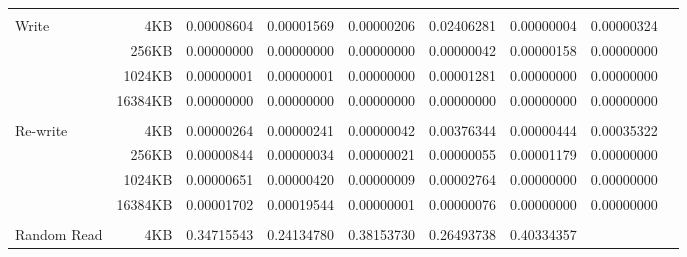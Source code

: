 \begin{table}[!htp]
\begin{tabular}{lrrrrrrrr}
& & & & & & & \\
\multirow{4}{*}{Write} &4KB &\cellcolor[HTML]{f4c7c3}0.00008604 &\cellcolor[HTML]{f4c7c3}0.00001569 &\cellcolor[HTML]{f4c7c3}0.00000206 &\cellcolor[HTML]{f4c7c3}0.02406281 &\cellcolor[HTML]{f4c7c3}0.00000004 &\cellcolor[HTML]{f4c7c3}0.00000324 \\
&256KB &\cellcolor[HTML]{f4c7c3}0.00000000 &\cellcolor[HTML]{f4c7c3}0.00000000 &\cellcolor[HTML]{f4c7c3}0.00000000 &\cellcolor[HTML]{f4c7c3}0.00000042 &\cellcolor[HTML]{f4c7c3}0.00000158 &\cellcolor[HTML]{f4c7c3}0.00000000 \\
&1024KB &\cellcolor[HTML]{f4c7c3}0.00000001 &\cellcolor[HTML]{f4c7c3}0.00000001 &\cellcolor[HTML]{f4c7c3}0.00000000 &\cellcolor[HTML]{f4c7c3}0.00001281 &\cellcolor[HTML]{f4c7c3}0.00000000 &\cellcolor[HTML]{f4c7c3}0.00000000 \\
&16384KB &\cellcolor[HTML]{f4c7c3}0.00000000 &\cellcolor[HTML]{f4c7c3}0.00000000 &\cellcolor[HTML]{f4c7c3}0.00000000 &\cellcolor[HTML]{f4c7c3}0.00000000 &\cellcolor[HTML]{f4c7c3}0.00000000 &\cellcolor[HTML]{f4c7c3}0.00000000 \\
& & & & & & & \\
\multirow{4}{*}{Re-write} &4KB &\cellcolor[HTML]{f4c7c3}0.00000264 &\cellcolor[HTML]{f4c7c3}0.00000241 &\cellcolor[HTML]{f4c7c3}0.00000042 &\cellcolor[HTML]{f4c7c3}0.00376344 &\cellcolor[HTML]{f4c7c3}0.00000444 &\cellcolor[HTML]{f4c7c3}0.00035322 \\
&256KB &\cellcolor[HTML]{f4c7c3}0.00000844 &\cellcolor[HTML]{f4c7c3}0.00000034 &\cellcolor[HTML]{f4c7c3}0.00000021 &\cellcolor[HTML]{f4c7c3}0.00000055 &\cellcolor[HTML]{f4c7c3}0.00001179 &\cellcolor[HTML]{f4c7c3}0.00000000 \\
&1024KB &\cellcolor[HTML]{f4c7c3}0.00000651 &\cellcolor[HTML]{f4c7c3}0.00000420 &\cellcolor[HTML]{f4c7c3}0.00000009 &\cellcolor[HTML]{f4c7c3}0.00002764 &\cellcolor[HTML]{f4c7c3}0.00000000 &\cellcolor[HTML]{f4c7c3}0.00000000 \\
&16384KB &\cellcolor[HTML]{f4c7c3}0.00001702 &\cellcolor[HTML]{f4c7c3}0.00019544 &\cellcolor[HTML]{f4c7c3}0.00000001 &\cellcolor[HTML]{f4c7c3}0.00000076 &\cellcolor[HTML]{f4c7c3}0.00000000 &\cellcolor[HTML]{f4c7c3}0.00000000 \\
& & & & & & & \\
\multirow{4}{*}{Random Read} &4KB &\cellcolor[HTML]{b7e1cd}0.34715543 &\cellcolor[HTML]{b7e1cd}0.24134780 &\cellcolor[HTML]{b7e1cd}0.38153730 &\cellcolor[HTML]{b7e1cd}0.26493738 &\cellcolor[HTML]{b7e1cd}0.40334357 & \\

\end{tabular}
\end{table}
